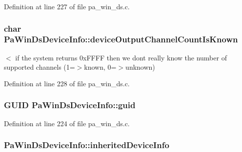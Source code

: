 Definition at line 227 of file pa\+\_\+win\+\_\+ds.\+c.

\subsubsection[{\texorpdfstring{device\+Output\+Channel\+Count\+Is\+Known}{deviceOutputChannelCountIsKnown}}]{\setlength{\rightskip}{0pt plus 5cm}char Pa\+Win\+Ds\+Device\+Info\+::device\+Output\+Channel\+Count\+Is\+Known}\hypertarget{struct_pa_win_ds_device_info_a4933d949b4dbb2b47137137546a47632}{}\label{struct_pa_win_ds_device_info_a4933d949b4dbb2b47137137546a47632}
$<$ if the system returns 0x\+F\+F\+FF then we don\textquotesingle{}t really know the number of supported channels (1=$>$known, 0=$>$unknown) 

Definition at line 228 of file pa\+\_\+win\+\_\+ds.\+c.

\subsubsection[{\texorpdfstring{guid}{guid}}]{\setlength{\rightskip}{0pt plus 5cm}G\+U\+ID Pa\+Win\+Ds\+Device\+Info\+::guid}\hypertarget{struct_pa_win_ds_device_info_a0a3d0a756c34d9b1f94e72f48af7ca98}{}\label{struct_pa_win_ds_device_info_a0a3d0a756c34d9b1f94e72f48af7ca98}


Definition at line 224 of file pa\+\_\+win\+\_\+ds.\+c.

\subsubsection[{\texorpdfstring{inherited\+Device\+Info}{inheritedDeviceInfo}}]{ Pa\+Win\+Ds\+Device\+Info\+::inherited\+Device\+Info}\hypertarget{struct_pa_win_ds_device_info_a1fc878338f87a1c8042e76a057de0c7e}{}\label{struct_pa_win_ds_device_info_a1fc878338f87a1c8042e76a057de0c7e}


